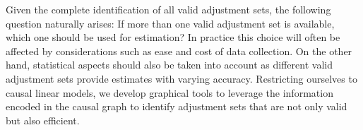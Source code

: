 \documentclass[11pt,a4paper]{article}
\theoremstyle{definition}
\theoremstyle{remark}
\newcommand{\mpdag}{maximal PDAG}
\begin{document}
Given the complete identification of all valid adjustment sets, the following question naturally arises: If more than one valid adjustment set is available, which one should be used for estimation? 
In practice this choice will often be affected by considerations such as ease and cost of data collection. On the other hand, statistical aspects should also be taken into account as different valid adjustment sets provide estimates with varying accuracy. 
Restricting ourselves to causal linear models, we develop graphical tools to leverage the information encoded in the causal graph to identify adjustment sets that are not only valid but also efficient.  




%
%

%
\end{document}
